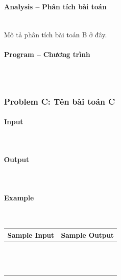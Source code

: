\documentclass{article}
\begin{document}
\paragraph{Analysis -- Phân tích bài toán} \mbox{} \\

Mô tả phân tích bài toán B ở đây.

\paragraph{Program -- Chương trình} \mbox{} \\

\begin{lstlisting}

\end{lstlisting}

\subsubsection{Problem C: Tên bài toán C}

\paragraph{Input} \mbox{} \\



\paragraph{Output}\mbox{} \\


\paragraph{Example}\mbox{} \\

\begin{table}[h]
    \centering
    \begin{tabular}{|l|r|}
        \hline
        \textbf{Sample Input} & \textbf{Sample Output} \\
        \hline
		&  \\ 
		&  \\ 
		&  \\ 
		&  \\ 
		&  \\
		&  \\ 
		&  \\ 
		&  \\ 
		&  \\ 
		&  \\ 
		&  \\ 
		&  \\
		&  \\ \hline
    \end{tabular}
\end{table}
\end{document}
